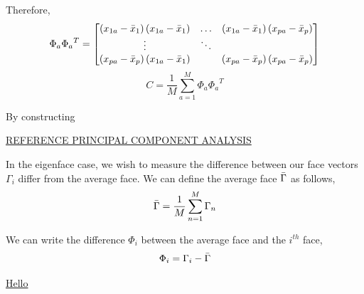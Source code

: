 \documentclass[12pt]{report}
\begin{document}
\begin{myproof}
                Therefore,
                    \[
                        \Phi_a {\Phi_a}^T = \begin{bmatrix}
                            \left(x_{1a} - \bar{x}_1\right)\left(x_{1a} - \bar{x}_1\right) & \dotsc & \left(x_{1a} - \bar{x}_1\right) \left(x_{pa} - \bar{x}_p\right) \\
                            \vdots & \ddots & \\
                            \left(x_{pa} - \bar{x}_p\right) \left(x_{1a} - \bar{x}_1\right) & & \left(x_{pa} - \bar{x}_p\right) \left(x_{pa} - \bar{x}_p\right)
                        \end{bmatrix}
                    \]
                    \[
                        C = \frac{1}{M} \sum_{a=1}^M \Phi_a {\Phi_a}^T
                    \]
            \end{myproof}
            
            By constructing 
            
            \href{https://builtin.com/data-science/step-step-explanation-principal-component-analysis}{REFERENCE PRINCIPAL COMPONENT ANALYSIS}
            
            In the eigenface case, we wish to measure the difference between our face vectors $\Gamma_i$ differ from the average face. We can define the average face $\bar{\Gamma}$ as follows,
                \[
                    \bar{\Gamma} = \frac{1}{M} \sum_{n=1}^M \Gamma_n
                \]
    
            We can write the difference $\Phi_i$ between the average face and the $i^{th}$ face,
                \[
                    \Phi_i = \Gamma_i - \bar{\Gamma}
                \]
            
            \href{https://nzmaths.co.nz/category/glossary/variance-discrete-random-variable\#:\textasciitilde:text=A\%20measure\%20of\%20spread\%20for,2\%20or\%20\%CF\%832x.}{Hello}
            
    
            \begin{myproof}
                
            \end{myproof}
            
\end{document}
